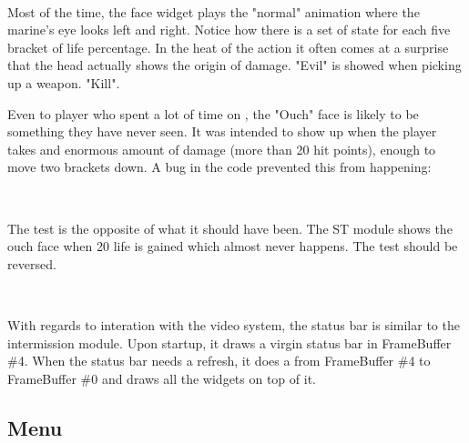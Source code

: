 \par
{}\\
\par
Most of the time, the face widget plays the "normal" animation where the marine's eye looks left and right. Notice how there is a set of state for each five bracket of life percentage. In the heat of the action it often comes at a surprise that the head actually shows the origin of damage. "Evil" is showed when picking up a weapon. "Kill".\\
\par
Even to player who spent a lot of time on \doom, the "Ouch" face is likely to be something they have never seen. It was intended to show up when the player takes and enormous amount of damage (more than 20 hit points), enough to move two brackets down. A bug in the code prevented this from happening:\\
\par
{}\\
\par
The test is the opposite of what it should have been. The ST module shows the ouch face when 20 life is gained which almost never happens. The test should be reversed.\\
\par
{}\\
\par
With regards to interation with the video system, the status bar is similar to the intermission module. Upon startup, it draws a virgin status bar in FrameBuffer \#4. When the status bar needs a refresh, it does a  from FrameBuffer \#4 to FrameBuffer \#0 and draws all the widgets on top of it.\\
\par
{}


\subsection{Menu}

